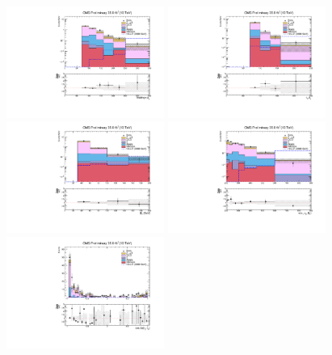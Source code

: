\begin{figure}[H]
 \begin{center}
 \captionsetup[subfloat]{farskip=0pt,captionskip=0.0cm,labelformat=empty}
 \includegraphics[clip,width=0.46\textwidth]{figuras/Chapter5/Plots_CosDphiInv/leadtaupt.pdf}
 \includegraphics[clip,width=0.46\textwidth]{figuras/Chapter5/Plots_CosDphiInv/tau2pt.pdf} \hfill
 \includegraphics[clip,width=0.46\textwidth]{figuras/Chapter5/Plots_CosDphiInv/MET.pdf}
 \includegraphics[clip,width=0.46\textwidth]{figuras/Chapter5/Plots_CosDphiInv/Mass.pdf}\hfill
 \includegraphics[clip,width=0.46\textwidth]{figuras/Chapter5/Plots_CosDphiInv/cosDphi.pdf}

\end{center}
\end{figure}
